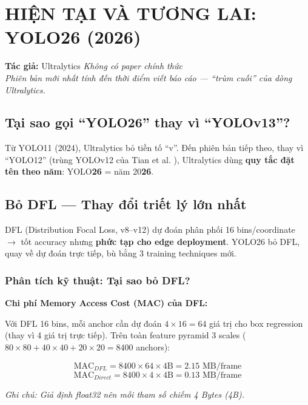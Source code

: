 \chapter{HIỆN TẠI VÀ TƯƠNG LAI: YOLO26 (2026)}

\textbf{Tác giả:} Ultralytics \hfill \textit{Không có paper chính thức} \cite{yolo26}\\
\textit{Phiên bản mới nhất tính đến thời điểm viết báo cáo --- ``trùm cuối'' của dòng Ultralytics.}

\section{Tại sao gọi ``YOLO26'' thay vì ``YOLOv13''?}
Từ YOLO11 (2024), Ultralytics bỏ tiền tố ``v''. Đến phiên bản tiếp theo, thay vì ``YOLO12'' (trùng YOLOv12 của Tian et al. \cite{yolov12}), Ultralytics dùng \textbf{quy tắc đặt tên theo năm}: YOLO\textbf{26} = năm 20\textbf{26}.

\section{Bỏ DFL --- Thay đổi triết lý lớn nhất}

DFL (Distribution Focal Loss, v8--v12) dự đoán phân phối 16 bins/coordinate $\rightarrow$ tốt accuracy nhưng \textbf{phức tạp cho edge deployment}. YOLO26 bỏ DFL, quay về dự đoán trực tiếp, bù bằng 3 training techniques mới.

\subsection{Phân tích kỹ thuật: Tại sao bỏ DFL?}

\textbf{Chi phí Memory Access Cost (MAC) của DFL:}

Với DFL 16 bins, mỗi anchor cần dự đoán $4 \times 16 = 64$ giá trị cho box regression (thay vì 4 giá trị trực tiếp). Trên toàn feature pyramid 3 scales ($80 \times 80 + 40 \times 40 + 20 \times 20 = 8400$ anchors):

\begin{equation}
\text{MAC}_{DFL} = 8400 \times 64 \times 4\text{B} = 2.15\text{ MB/frame}
\end{equation}
\begin{equation}
\text{MAC}_{Direct} = 8400 \times 4 \times 4\text{B} = 0.13\text{ MB/frame}
\end{equation}

\textit{Ghi chú: Giả định float32 nên mỗi tham số chiếm 4 Bytes (4B).}

